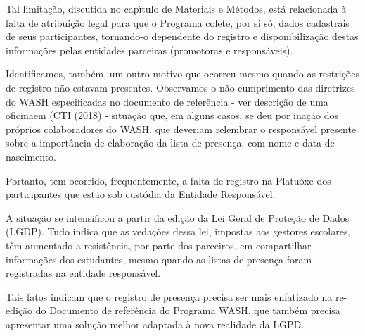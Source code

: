 \documentclass[
12pt,		%
openright,	%
twoside,  %
a4paper,			%
chapter=TITLE,		%
english,			%
french,				%
spanish,			%
brazil				%
]{USPSC-classe/USPSC}
\begin{document}
Tal limita\c{c}\~ao, discutida no cap\'{\i}tulo de Materiais e M\'etodos, est\'a relacionada \`a falta de atribui\c{c}\~ao legal para que o Programa colete, por si s\'o, dados cadastrais de seus participantes, tornando-o dependente do registro e disponibiliza\c{c}\~ao destas informa\c{c}\~oes pelas entidades parceiras (promotoras e respons\'aveis).









Identificamos, tamb\'em, um outro motivo que ocorreu mesmo quando as restri\c{c}\~oes de registro n\~ao estavam presentes. Observamos o n\~ao cumprimento das diretrizes do WASH especificadas no documento de refer\^encia - ver \textquotedbl descri\c{c}\~ao de uma oficina\textquotedbl  em (CTI (2018) - situa\c{c}\~ao que, em alguns casos, se deu por ina\c{c}\~ao dos pr\'oprios colaboradores do WASH, que deveriam relembrar o respons\'avel presente sobre a import\^ancia de elabora\c{c}\~ao da lista de presen\c{c}a, com nome e data de nascimento.









Portanto, tem ocorrido, frequentemente, a falta de registro na Platu\'oxe dos participantes que est\~ao sob cust\'odia da Entidade Respons\'avel.









A situa\c{c}\~ao se intensificou a partir da edi\c{c}\~ao da Lei Geral de Prote\c{c}\~ao de Dados (LGDP). Tudo indica que as veda\c{c}\~oes dessa lei, impostas aos gestores escolares, t\^em aumentado a resist\^encia, por parte dos parceiros, em compartilhar informa\c{c}\~oes dos estudantes, mesmo quando as listas de presen\c{c}a foram registradas na entidade respons\'avel.









Tais fatos indicam que o registro de presen\c{c}a precisa ser mais enfatizado na re-edi\c{c}\~ao do Documento de refer\^encia do Programa WASH, que tamb\'em precisa apresentar uma solu\c{c}\~ao melhor adaptada \`a nova realidade da LGPD.
\end{document}

